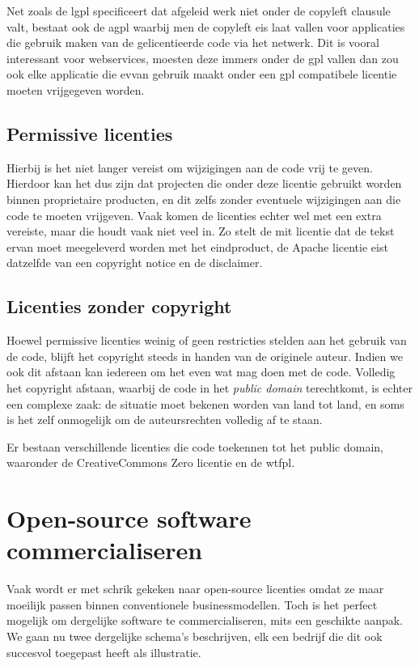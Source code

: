 Net zoals de \ac{lgpl} specificeert dat afgeleid werk niet onder de copyleft clausule valt, bestaat ook de \ac{agpl} waarbij men de copyleft eis laat vallen voor applicaties die gebruik maken van de gelicentieerde code via het netwerk. Dit is vooral interessant voor webservices, moesten deze immers onder de \ac{gpl} vallen dan zou ook elke applicatie die evvan gebruik maakt onder een \ac{gpl} compatibele licentie moeten vrijgegeven worden.

\subsection{Permissive licenties}

Hierbij is het niet langer vereist om wijzigingen aan de code vrij te geven. Hierdoor kan het dus zijn dat projecten die onder deze licentie gebruikt worden binnen proprietaire producten, en dit zelfs zonder eventuele wijzigingen aan die code te moeten vrijgeven. Vaak komen de licenties echter wel met een extra vereiste, maar die houdt vaak niet veel in. Zo stelt de \ac{mit} licentie dat de tekst ervan moet meegeleverd worden met het eindproduct, de Apache licentie eist datzelfde van een copyright notice en de disclaimer.

\subsection{Licenties zonder copyright}

Hoewel permissive licenties weinig of geen restricties stelden aan het gebruik van de code, blijft het copyright steeds in handen van de originele auteur. Indien we ook dit afstaan kan iedereen om het even wat mag doen met de code. Volledig het copyright afstaan, waarbij de code in het \emph{public domain} terechtkomt, is echter een complexe zaak: de situatie moet bekenen worden van land tot land, en soms is het zelf onmogelijk om de auteursrechten volledig af te staan.

Er bestaan verschillende licenties die code toekennen tot het public domain, waaronder de CreativeCommons Zero licentie en de \ac{wtfpl}.

\section{Open-source software commercialiseren}

Vaak wordt er met schrik gekeken naar open-source licenties omdat ze maar moeilijk passen binnen conventionele businessmodellen. Toch is het perfect mogelijk om dergelijke software te commercialiseren, mits een geschikte aanpak. We gaan nu twee dergelijke schema's beschrijven, elk een bedrijf die dit ook succesvol toegepast heeft als illustratie.

